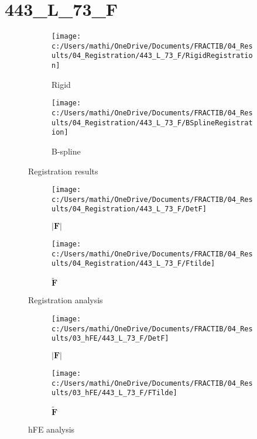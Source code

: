\documentclass{article}%
\begin{document}
%
\newpage%
\section*{443\_L\_73\_F}%
\label{sec:443L73F}%


\begin{figure}[h!]%
\begin{subfigure}[b]{0.5\linewidth}%
\texttt{[image: c:/Users/mathi/OneDrive/Documents/FRACTIB/04\_Results/04\_Registration/443\_L\_73\_F/RigidRegistration]}%
\caption{Rigid}%
\end{subfigure}%
\begin{subfigure}[b]{0.5\linewidth}%
\texttt{[image: c:/Users/mathi/OneDrive/Documents/FRACTIB/04\_Results/04\_Registration/443\_L\_73\_F/BSplineRegistration]}%
\caption{B{-}spline}%
\end{subfigure}%
\caption{Registration results}%
\end{figure}

%


\begin{figure}[h!]%
\begin{subfigure}[b]{0.5\linewidth}%
\texttt{[image: c:/Users/mathi/OneDrive/Documents/FRACTIB/04\_Results/04\_Registration/443\_L\_73\_F/DetF]}%
\caption{$|\mathbf{F}|$}%
\end{subfigure}%
\begin{subfigure}[b]{0.5\linewidth}%
\texttt{[image: c:/Users/mathi/OneDrive/Documents/FRACTIB/04\_Results/04\_Registration/443\_L\_73\_F/Ftilde]}%
\caption{$\tilde{\mathbf{F}}$}%
\end{subfigure}%
\caption{Registration analysis}%
\end{figure}

%


\begin{figure}[h!]%
\begin{subfigure}[b]{0.5\linewidth}%
\texttt{[image: c:/Users/mathi/OneDrive/Documents/FRACTIB/04\_Results/03\_hFE/443\_L\_73\_F/DetF]}%
\caption{$|\mathbf{F}|$}%
\end{subfigure}%
\begin{subfigure}[b]{0.5\linewidth}%
\texttt{[image: c:/Users/mathi/OneDrive/Documents/FRACTIB/04\_Results/03\_hFE/443\_L\_73\_F/FTilde]}%
\caption{$\tilde{\mathbf{F}}$}%
\end{subfigure}%
\caption{hFE analysis}%
\end{figure}
\end{document}
